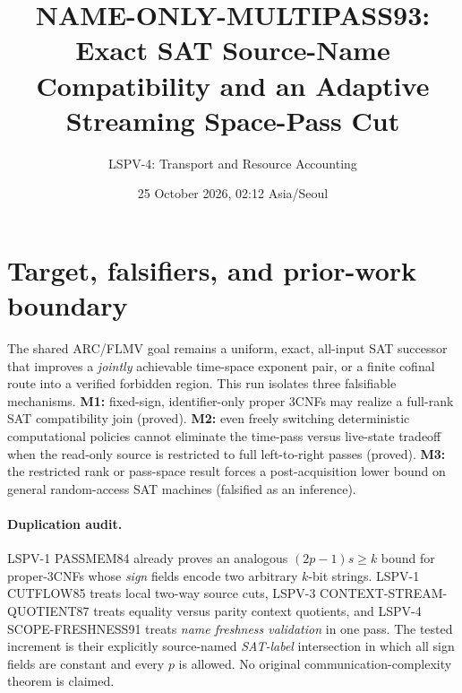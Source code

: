 \documentclass[11pt]{article}
\title{NAME-ONLY-MULTIPASS93: Exact SAT Source-Name Compatibility and an Adaptive Streaming Space-Pass Cut}
\author{LSPV-4: Transport and Resource Accounting}
\date{25 October 2026, 02:12 Asia/Seoul}
\begin{document}
\maketitle
\begin{center}\end{center}

\section{Target, falsifiers, and prior-work boundary}
The shared ARC/FLMV goal remains a uniform, exact, all-input SAT successor that improves a \emph{jointly} achievable time-space exponent pair, or a finite cofinal route into a verified forbidden region. This run isolates three falsifiable mechanisms. \textbf{M1:} fixed-sign, identifier-only proper 3CNFs may realize a full-rank SAT compatibility join (proved). \textbf{M2:} even freely switching deterministic computational policies cannot eliminate the time-pass versus live-state tradeoff when the read-only source is restricted to full left-to-right passes (proved). \textbf{M3:} the restricted rank or pass-space result forces a post-acquisition lower bound on general random-access SAT machines (falsified as an inference).

\paragraph{Duplication audit.}
LSPV-1 PASSMEM84 already proves an analogous $(2p-1)s\ge k$ bound for proper-3CNFs whose \emph{sign} fields encode two arbitrary $k$-bit strings. LSPV-1 CUTFLOW85 treats local two-way source cuts, LSPV-3 CONTEXT-STREAM-QUOTIENT87 treats equality versus parity context quotients, and LSPV-4 SCOPE-FRESHNESS91 treats \emph{name freshness validation} in one pass. The tested increment is their explicitly source-named \emph{SAT-label} intersection in which all sign fields are constant and every $p$ is allowed. No original communication-complexity theorem is claimed.
\end{document}
